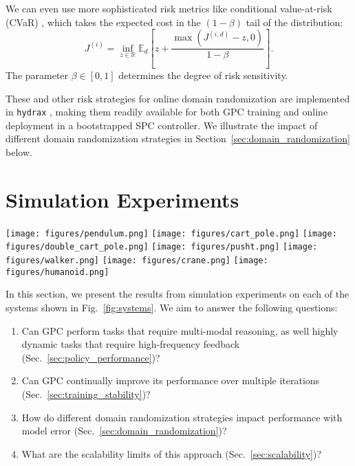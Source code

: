 \documentclass[letterpaper, 10 pt]{ieeeconf}
\begin{document}
We can even use more sophisticated risk metrics like conditional value-at-risk (CVaR) \cite{rockafellar2000optimization, dixit2023risk}, which takes the expected cost in the $(1 - \beta)$ tail of the distribution:
\begin{equation}\label{eq:cvar_dr}
    J^{(i)} = \inf_{z \in \mathbb{R}} \mathbb{E}_d \left[ z + \frac{\max(J^{(i, d)} - z, 0)}{1 - \beta} \right].
\end{equation}
The parameter $\beta \in [0, 1]$ determines the degree of risk sensitivity. 

These and other risk strategies for online domain randomization are implemented in \texttt{hydrax} \cite{kurtz2024hydrax}, making them readily available for both GPC training and online deployment in a bootstrapped SPC controller. We illustrate the impact of different domain randomization strategies in Section~\ref{sec:domain_randomization} below.

\section{Simulation Experiments}\label{sec:experiments}

\begin{figure*}
    \centering
    \texttt{[image: figures/pendulum.png]}
    \texttt{[image: figures/cart\_pole.png]}
    \texttt{[image: figures/double\_cart\_pole.png]}
    \texttt{[image: figures/pusht.png]}
    \texttt{[image: figures/walker.png]}
    \texttt{[image: figures/crane.png]}
    \texttt{[image: figures/humanoid.png]}
    \caption{Systems used to evaluate GPC performance, from left to right: inverted pendulum, cart-pole, double cart-pole, push-T, planar biped, luffing crane, humanoid.}
    \label{fig:systems}
\end{figure*}

In this section, we present the results from simulation experiments on each of the systems shown in Fig.~\ref{fig:systems}. We aim to answer the following questions:
\begin{enumerate}
    \item Can GPC perform tasks that require multi-modal reasoning, as well highly dynamic tasks that require high-frequency feedback (Sec.~\ref{sec:policy_performance})?
    \item Can GPC continually improve its performance over multiple iterations (Sec.~\ref{sec:training_stability})?
    \item How do different domain randomization strategies impact performance with model error (Sec.~\ref{sec:domain_randomization})?
    \item What are the scalability limits of this approach (Sec.~\ref{sec:scalability})?
\end{enumerate}
\end{document}
